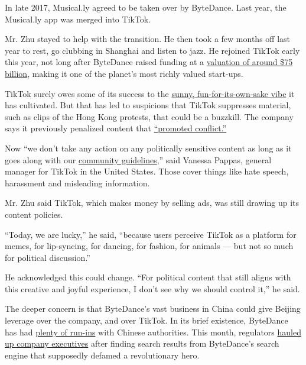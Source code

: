 In late 2017, Musical.ly agreed to be taken over by ByteDance. Last
year, the Musical.ly app was merged into TikTok.

Mr. Zhu stayed to help with the transition. He then took a few months
off last year to rest, go clubbing in Shanghai and listen to jazz. He
rejoined TikTok early this year, not long after ByteDance raised funding
at a
\href{https://www.nytimes.com/2018/09/28/technology/bytedance-fundraising-toutiao-tiktok.html}{valuation
of around \$75 billion}, making it one of the planet's most richly
valued start-ups.

TikTok surely owes some of its success to the
\href{https://www.nytimes.com/2018/12/03/technology/tiktok-a-chinese-video-app-brings-fun-back-to-social-media.html}{sunny,
fun-for-its-own-sake vibe} it has cultivated. But that has led to
suspicions that TikTok suppresses material, such as clips of the Hong
Kong protests, that could be a buzzkill. The company says it previously
penalized content that
\href{https://www.theguardian.com/technology/2019/sep/25/revealed-how-tiktok-censors-videos-that-do-not-please-beijing}{``promoted
conflict.''}

Now ``we don't take any action on any politically sensitive content as
long as it goes along with our
\href{https://support.tiktok.com/en/privacy-safety/community-policy-en}{community
guidelines},'' said Vanessa Pappas, general manager for TikTok in the
United States. Those cover things like hate speech, harassment and
misleading information.

Mr. Zhu said TikTok, which makes money by selling ads, was still drawing
up its content policies.

``Today, we are lucky,'' he said, ``because users perceive TikTok as a
platform for memes, for lip-syncing, for dancing, for fashion, for
animals --- but not so much for political discussion.''

He acknowledged this could change. ``For political content that still
aligns with this creative and joyful experience, I don't see why we
should control it,'' he said.

The deeper concern is that ByteDance's vast business in China could give
Beijing leverage over the company, and over TikTok. In its brief
existence, ByteDance has had
\href{https://www.nytimes.com/2018/04/12/business/china-bytedance-duanzi-censor.html}{plenty
of run-ins} with Chinese authorities. This month, regulators
\href{https://mp.weixin.qq.com/s/cNOmVWg4lagP5kTAlvoFHw}{hauled up
company executives} after finding search results from ByteDance's search
engine that supposedly defamed a revolutionary hero.

